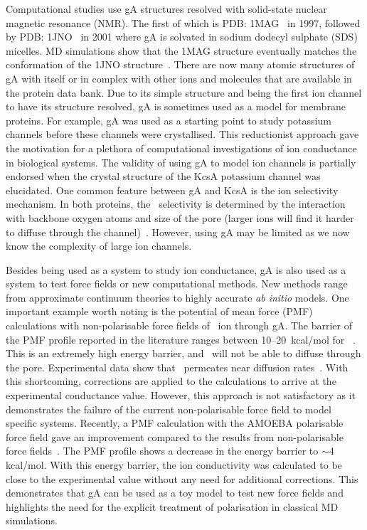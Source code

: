 Computational studies use gA structures resolved with solid-state nuclear magnetic resonance 
(NMR). The first of which is PDB: 1MAG~\cite{Ketchem1996} in 1997, followed by PDB: 
1JNO~\cite{Townsley2001} in 2001 where gA is solvated in sodium dodecyl sulphate (SDS) micelles. 
MD simulations show that the 1MAG structure eventually matches the conformation of the 1JNO 
structure~\cite{Allen2003a}. There are now many atomic structures of gA with itself or in complex 
with other ions and molecules that are available in the protein data bank. Due to its simple 
structure and being the first ion channel to have its structure resolved, gA is sometimes used 
as a model for membrane proteins. For example, gA was used as a starting point to study potassium 
channels before these channels were crystallised. This reductionist approach gave the motivation 
for a plethora of computational investigations of ion conductance in biological systems. The 
validity of using gA to model ion channels is partially endorsed when the crystal structure of 
the KcsA potassium channel was elucidated. One common feature between gA and KcsA is the ion 
selectivity mechanism. In both proteins, the \K\ selectivity is determined by the interaction 
with backbone oxygen atoms and size of the pore (larger ions will find it harder to diffuse 
through the channel)~\cite{Kelkar2007}. However, using gA may be limited as we now know the 
complexity of large ion channels.

Besides being used as a system to study ion conductance, gA is also used as a system to test 
force fields or new computational methods. New methods range from approximate continuum theories 
to highly accurate \textit{ab initio} models. One important example worth noting is the potential 
of mean force (PMF) calculations with non-polarisable force fields of \K\ ion through gA. The 
barrier of the PMF profile reported in the literature ranges between 10--20~kcal/mol for 
\K~\cite{Bastug2006c,Allen2003,Allen2004,Bastug2007}. This is an extremely high energy barrier, 
and \K\ will not be able to diffuse through the pore. Experimental data show that 
\K\ permeates near diffusion rates~\cite{Hille2001}. With this shortcoming, corrections are applied 
to the calculations to arrive at the experimental conductance value. However, this approach is 
not satisfactory as it demonstrates the failure of the current non-polarisable force field to 
model specific systems. Recently, a PMF calculation with the AMOEBA polarisable force field gave 
an improvement compared to the results from non-polarisable force fields~\cite{Peng2016}. The 
PMF profile shows a decrease in the energy barrier to $\sim$4 kcal/mol. With this energy barrier, 
the ion conductivity was calculated to be close to the experimental value without any need for 
additional corrections. This demonstrates that gA can be used as a toy model to test new force 
fields and highlights the need for the explicit treatment of polarisation in classical MD simulations.

